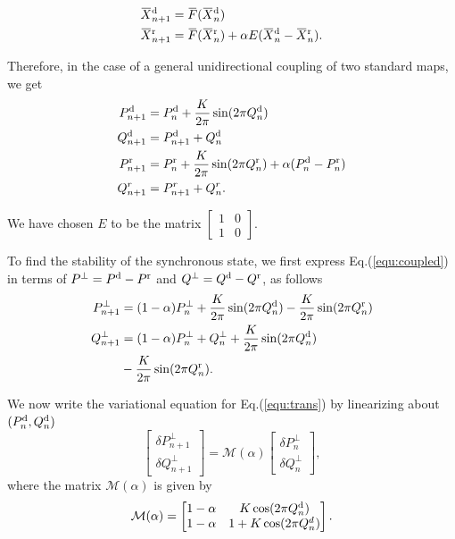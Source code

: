 \documentclass[reprint,amsmath,amssymb,aps,pre]{revtex4-1}
\newcommand{\overbar}[1]{\mkern 1.5mu\overline{\mkern-1.5mu#1\mkern-1.5mu}\mkern 1.5mu}
\begin{document}
\begin{align}
\overbar{X}^\textnormal{d}_{n+1} &= \overbar{F}(\overbar{X}^\textnormal{d}_{n}) \nonumber  \\
\overbar{X}^\textnormal{r}_{n+1} &= \overbar{F}(\overbar{X}^\textnormal{r}_{n}) + \alpha 
E(\overbar{X}^\textnormal{d}_{n}-\overbar{X}^\textnormal{r}_n).
\end{align}

Therefore, in the case of a general unidirectional coupling of two standard maps, we get
\begin{align}
P^\textnormal{d}_{n+1} &= P^\textnormal{d}_n + \frac{K}{2\pi}\sin(2\pi Q^\textnormal{d}_n) \nonumber\\
Q^\textnormal{d}_{n+1} &= P^\textnormal{d}_{n+1} + Q^\textnormal{d}_n \nonumber\\
P^\textnormal{r}_{n+1} &= P^\textnormal{r}_n + \frac{K}{2\pi}\sin (2\pi Q^\textnormal{r}_n) + \alpha(P^\textnormal{d}_n-P^\textnormal{r}_n) \nonumber \\
Q^r_{n+1} &= P^r_{n+1} + Q^r_n.
\label{equ:coupled}
\end{align}


We have chosen $E$ to be the matrix $\begin{bmatrix} 1 & 0 \\ 1 & 0 \end{bmatrix}$. 

To find the stability of the synchronous state, we first express  
Eq.(\ref{equ:coupled}) in terms of  $P^\perp = P^\textnormal{d} - 
P^\textnormal{r}$ and $Q^\perp = Q^\textnormal{d} -Q^\textnormal{r}$, as 
follows
\begin{eqnarray}
\label{equ:trans}
P^\perp_{n+1} &= (1-\alpha)P^\perp_n+ \frac{K}{2\pi} \sin(2\pi Q^\textnormal{d}_n) - 
\frac{K}{2\pi} \sin(2\pi Q^\textnormal{r}_n) \nonumber \\ 
Q^\perp_{n+1} &= (1-\alpha)P^\perp_n+ Q^\perp_n + \frac{K}{2\pi} \sin(2\pi 
Q^\textnormal{d}_n) \nonumber \\ &- \frac{K}{2\pi} \sin(2\pi Q^\textnormal{r}_n).
\end{eqnarray}

We now write the variational equation for Eq.(\ref{equ:trans}) by linearizing 
about $(P^\textnormal{d}_n,Q^\textnormal{d}_n)$
\begin{equation}
\label{equ:variational}
\left[ \begin{array}{c} \delta P^\perp_{n+1} \\ \delta Q^\perp_{n+1} 
\end{array} \right] = \mathcal{M}(\alpha)\left[ \begin{array}{c}\delta 
P^\perp_{n} \\ \delta Q^\perp_{n} \end{array} \right],
\end{equation}
where the matrix $\mathcal{M}(\alpha)$ is given by
\begin{equation} 
\label{equ:M}
\mathcal{M}(\alpha) = \begin{bmatrix} 1-\alpha & K\cos(2\pi Q^\textnormal{d}_n) \\ 1 - 
\alpha & 1 + K\cos(2\pi Q^d_n) \end{bmatrix}.
\end{equation}
\end{document}
